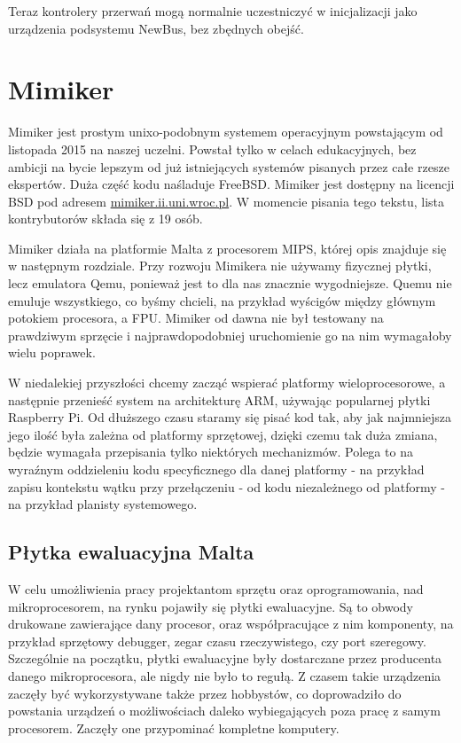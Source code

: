 \documentclass[shortabstract,inz]{iithesis}
\begin{document}
Teraz kontrolery przerwań mogą normalnie uczestniczyć w inicjalizacji jako urządzenia
podsystemu NewBus, bez zbędnych obejść.





\chapter{Mimiker}
Mimiker jest prostym unixo-podobnym systemem operacyjnym powstającym od listopada 2015 na naszej uczelni. 
Powstał tylko w celach edukacyjnych, bez ambicji na bycie lepszym od już istniejących systemów pisanych przez 
całe rzesze ekspertów. Duża część kodu naśladuje FreeBSD.
Mimiker jest dostępny na licencji BSD pod adresem \url{mimiker.ii.uni.wroc.pl}. W momencie pisania 
tego tekstu, lista kontrybutorów składa się z 19 osób.

Mimiker działa na platformie Malta z procesorem MIPS, której opis znajduje się w następnym rozdziale.
Przy rozwoju Mimikera nie używamy fizycznej płytki, lecz emulatora
Qemu, ponieważ jest to dla nas znacznie wygodniejsze. Quemu nie emuluje wszystkiego, co byśmy
chcieli, na przykład wyścigów między głównym potokiem procesora, a FPU.
Mimiker od dawna nie był testowany na prawdziwym sprzęcie i
najprawdopodobniej uruchomienie go na nim wymagałoby wielu poprawek.


W niedalekiej przyszłości chcemy zacząć wspierać platformy
wieloprocesorowe, a następnie przenieść system na architekturę ARM,
używając popularnej płytki Raspberry Pi. Od dłuższego czasu staramy się pisać kod
tak, aby jak najmniejsza jego ilość była zależna od platformy
sprzętowej, dzięki czemu tak duża zmiana, będzie wymagała przepisania
tylko niektórych mechanizmów. Polega to na wyraźnym oddzieleniu kodu 
specyficznego dla danej platformy - na przykład zapisu kontekstu wątku
przy przełączeniu - od kodu niezależnego od platformy - na przykład 
planisty systemowego.

\section{Płytka ewaluacyjna Malta} %
\label{sec:malta}

W celu umożliwienia pracy projektantom sprzętu oraz oprogramowania, nad 
mikroprocesorem, na rynku pojawiły się płytki ewaluacyjne. Są to obwody drukowane 
zawierające dany procesor, oraz współpracujące z nim komponenty, na przykład 
sprzętowy debugger, zegar czasu rzeczywistego, czy port szeregowy. Szczególnie 
na początku, płytki ewaluacyjne były dostarczane przez producenta danego 
mikroprocesora, ale nigdy nie było to regułą. Z czasem takie urządzenia zaczęły 
być wykorzystywane także przez hobbystów, co doprowadziło do powstania urządzeń 
o możliwościach daleko wybiegających poza pracę z samym procesorem. Zaczęły one 
przypominać kompletne komputery.
\end{document}
